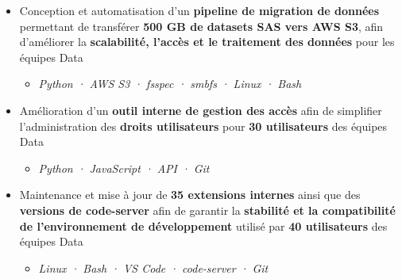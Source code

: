 \documentclass[10pt,english,french]{article}
\begin{document}
\begin{itemize}[leftmargin=0.5cm, label=\textbullet, itemsep=0.0625em]
    \item Conception et automatisation d'un \textbf{pipeline de migration de données}
          permettant de transférer \textbf{500\raisebox{0.20ex}{\small +} GB de datasets
              SAS vers AWS S3}, afin d'améliorer la \textbf{scalabilité, l'accès et le
              traitement des données} pour les équipes Data
          \begin{itemize}[leftmargin=0.25cm,label=\textendash,itemsep=0em,topsep=0.2em]
              \item \textit{\fontsize{10pt}{9pt}\selectfont Python · AWS S3 · fsspec · smbfs · Linux · Bash}
          \end{itemize}

    \item Amélioration d'un \textbf{outil interne de gestion des accès} afin de
          simplifier l'administration des \textbf{droits utilisateurs} pour
          \textbf{30\raisebox{0.20ex}{\small +} utilisateurs} des équipes Data
          \begin{itemize}[leftmargin=0.25cm,label=\textendash,itemsep=0em,topsep=0.2em]
              \item \textit{\fontsize{10pt}{9pt}\selectfont Python · JavaScript · API · Git}
          \end{itemize}

    \item Maintenance et mise à jour de \textbf{35\raisebox{0.20ex}{\small +} extensions
              internes} ainsi que des \textbf{versions de code-server} afin de garantir la
          \textbf{stabilité et la compatibilité de l'environnement de développement}
          utilisé par \textbf{40\raisebox{0.20ex}{\small +} utilisateurs} des équipes
          Data
          \begin{itemize}[leftmargin=0.25cm,label=\textendash,itemsep=0em,topsep=0.2em]
              \item \textit{\fontsize{10pt}{9pt}\selectfont Linux · Bash · VS Code · code-server · Git}
          \end{itemize}

\end{itemize}
\end{document}
